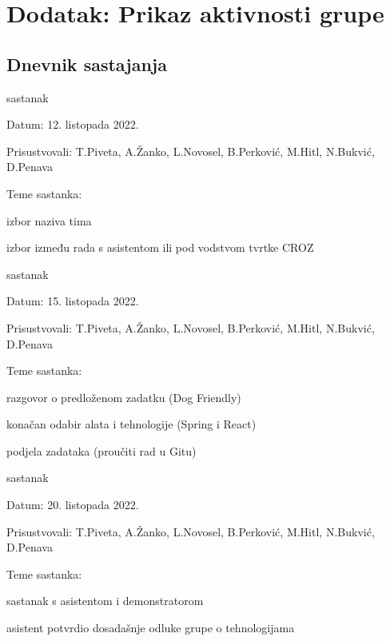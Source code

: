 \chapter*{Dodatak: Prikaz aktivnosti grupe}
		
		\section*{Dnevnik sastajanja}
		
		
		\begin{packed_enum}
			\item  sastanak
			
			\item[] \begin{packed_item}
				\item Datum: 12. listopada 2022.
				\item Prisustvovali: T.Piveta, A.Žanko, L.Novosel, B.Perković, M.Hitl, N.Bukvić, D.Penava
				\item Teme sastanka:
				\begin{packed_item}
					\item  izbor naziva tima
					\item  izbor između rada s asistentom ili pod vodstvom tvrtke CROZ
				\end{packed_item}
			\end{packed_item}
			
			\item  sastanak
			\item[] \begin{packed_item}
				\item Datum: 15. listopada 2022.
				\item Prisustvovali: T.Piveta, A.Žanko, L.Novosel, B.Perković, M.Hitl, N.Bukvić, D.Penava
				\item Teme sastanka:
				\begin{packed_item}
				    \item  razgovor o predloženom zadatku (Dog Friendly)
					\item  konačan odabir alata i tehnologije (Spring i React)
					\item  podjela zadataka (proučiti rad u Gitu)
				\end{packed_item}
			\end{packed_item}
			
			\item  sastanak
			\item[] \begin{packed_item}
				\item Datum: 20. listopada 2022.
				\item Prisustvovali: T.Piveta, A.Žanko, L.Novosel, B.Perković, M.Hitl, N.Bukvić, D.Penava
				\item Teme sastanka:
				\begin{packed_item}
				    \item  sastanak s asistentom i demonstratorom \item asistent potvrdio dosadašnje odluke grupe o tehnologijama
				\end{packed_item}
			\end{packed_item}
			

\end{packed_enum}
